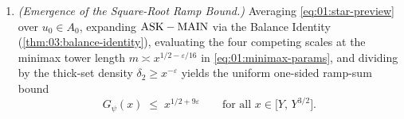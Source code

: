 \begin{theorem}
\begin{enumerate}[label=\textup{(\alph*)}]
\item \emph{(Emergence of the Square-Root Ramp Bound.)} Averaging \eqref{eq:01:star-preview} over $u_0 \in A_0$, expanding $\mathrm{ASK} - \mathrm{MAIN}$ via the Balance Identity (\cref{thm:03:balance-identity}), evaluating the four competing scales at the minimax tower length $m \asymp x^{1/2-\varepsilon/16}$ in \eqref{eq:01:minimax-params}, and dividing by the thick-set density $\delta_2 \ge x^{-\varepsilon}$ yields the uniform one-sided ramp-sum bound
\begin{equation}
\label{eq:01:gpsi-bound}
  G_\psi(x) \;\le\; x^{1/2 + 9\varepsilon} \qquad \text{for all } x \in \bigl[Y,\, Y^{3/2}\bigr].
\end{equation}
\end{enumerate}
\end{theorem}

